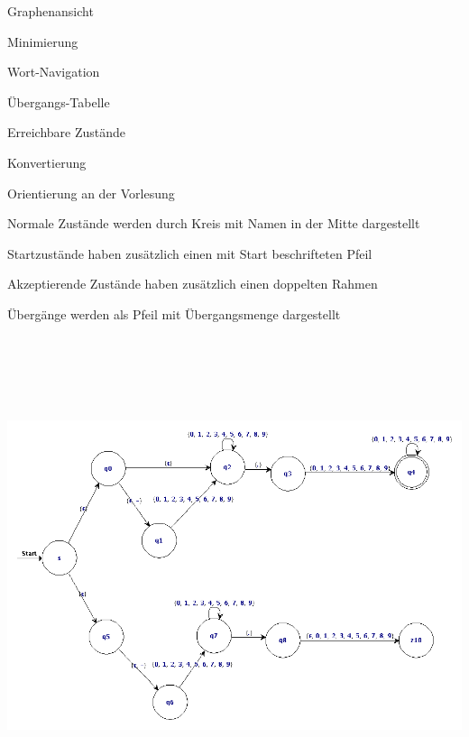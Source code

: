 



{
    \begin{itemgroup}{}
	\item Graphenansicht
	\item Minimierung
	\item Wort-Navigation
	\item Übergangs-Tabelle
	\item Erreichbare Zustände
	\item Konvertierung
	\end{itemgroup}

	\vfill{}
}


{
    \begin{itemgroup}{}
	\item Orientierung an der Vorlesung
	\item Normale Zustände werden durch Kreis mit Namen in der Mitte dargestellt
	\begin{itemgroup}{}
		\item Startzustände haben zusätzlich einen mit Start beschrifteten Pfeil
		\item Akzeptierende Zustände haben zusätzlich einen doppelten Rahmen
	\end{itemgroup}
	\item Übergänge werden als Pfeil mit Übergangsmenge dargestellt
	\end{itemgroup}

	\vfill{}
}


{
  \begin{center}
    \includegraphics[height=14cm]{../images/enfa_example.png}
  \end{center}
}


